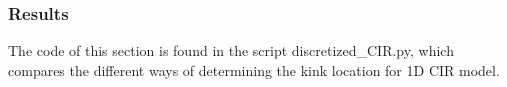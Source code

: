 \documentclass[11pt]{article}
\begin{document}
\subsubsection{Results}
The code of this section is found in the script discretized\_CIR.py, which compares the different ways of determining the kink location for 1D CIR model.






\FloatBarrier





%





 \newpage

 


\appendix
\end{document}
